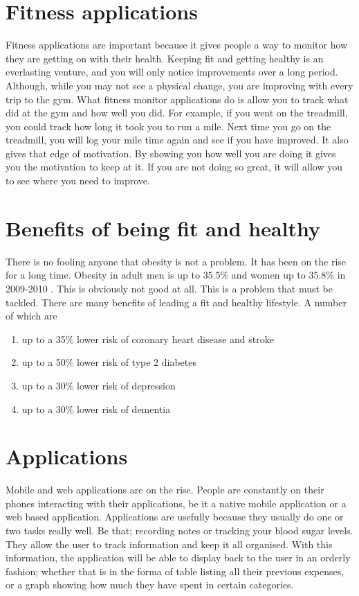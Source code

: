 \section{Fitness applications}
Fitness applications are important because it gives people a way to monitor how they are getting on with their health. Keeping fit and getting healthy is an everlasting venture, and you will only notice improvements over a long period. Although, while you may not see a physical change, you are improving with every trip to the gym. What fitness monitor applications do is allow you to track what did at the gym and how well you did. For example, if you went on the treadmill, you could track how long it took you to run a mile. Next time you go on the treadmill, you will log your mile time again and see if you have improved. It also gives that edge of motivation. By showing you how well you are doing it gives you the motivation to keep at it. If you are not doing so great, it will allow you to see where you need to improve.\\

\section{Benefits of being fit and healthy}
There is no fooling anyone that obesity is not a problem. It has been on the rise for a long time. Obesity in adult men is up to 35.5\% and women up to 35.8\% in 2009-2010 \citep{doi:10.1001}. This is obviously not good at all. This is a problem that must be tackled. There are many benefits of leading a fit and healthy lifestyle. A number of which are \citep{nhs:2013}

\begin{enumerate}
\item {up to a 35\% lower risk of coronary heart disease and stroke}
\item {up to a 50\% lower risk of type 2 diabetes}
\item {up to a 30\% lower risk of depression}
\item {up to a 30\% lower risk of dementia}
\end{enumerate}

\section{Applications}
Mobile and web applications are on the rise. People are constantly on their phones interacting with their applications, be it a native mobile application or a web based application. Applications are usefully because they usually do one or two tasks really well. Be that; recording notes or tracking your blood sugar levels. They allow the user to track information and keep it all organised. With this information, the application will be able to display back to the user in an orderly fashion; whether that is in the forma of table listing all their previous expenses, or a graph showing how much they have spent in certain categories.

